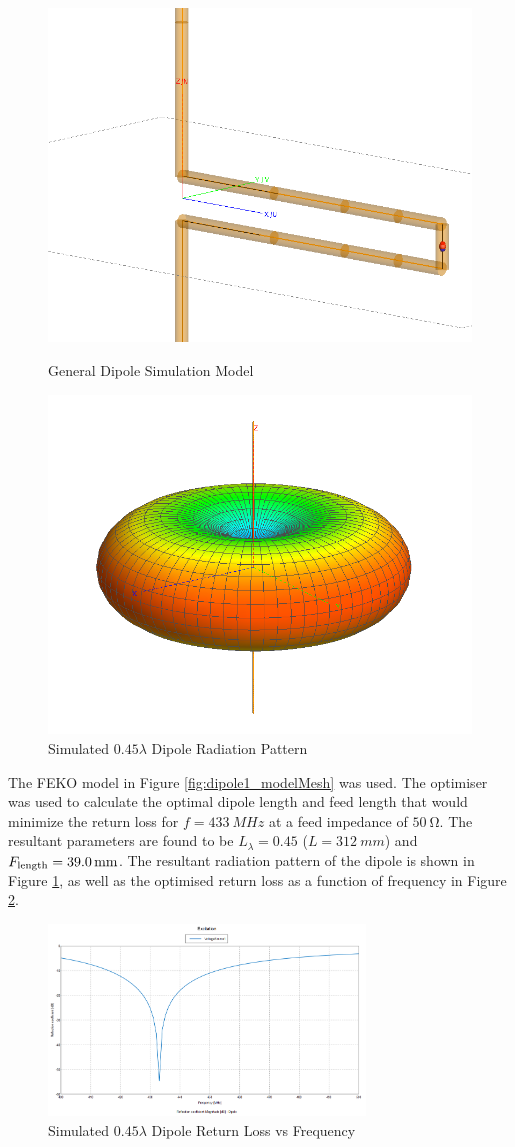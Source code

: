\begin{figure}[!htb]
  \begin{minipage}{.49\textwidth}
    \centering
    \includegraphics[width=0.65\linewidth]{dipole1_modelMesh}
    \caption{General Dipole Simulation Model}
    \label{fig:dipole1_modelMesh}
  \end{minipage}
  \begin{minipage}{.49\textwidth}
    \centering
    \includegraphics[width=0.65\linewidth]{dipole1_pattern_433MHz}
    \caption{Simulated $0.45 \lambda$ Dipole Radiation Pattern}
    \label{fig:dipole1_pattern_433MHz}
  \end{minipage}
\end{figure}

The FEKO model in Figure \ref{fig:dipole1_modelMesh} was used. The optimiser was used to calculate the optimal dipole length and feed length that would minimize the return loss for $f = \SI{433}{MHz}$ at a feed impedance of $\SI{50}{\ohm}$. The resultant parameters are found to be $L_\lambda = 0.45$ ($L = \SI{312}{mm}$) and $F_{\textnormal{length}} = \SI{39.0}{mm}$. The resultant radiation pattern of the dipole is shown in Figure \ref{fig:dipole1_pattern_433MHz}, as well as the optimised return loss as a function of frequency in Figure \ref{fig:dipole1_returnLoss}.

\begin{figure}[!htb]
  \centering
  \includegraphics[width=0.75\textwidth]{dipole1_returnLoss}
  \caption{Simulated $0.45 \lambda$ Dipole Return Loss vs Frequency}
  \label{fig:dipole1_returnLoss}
\end{figure}